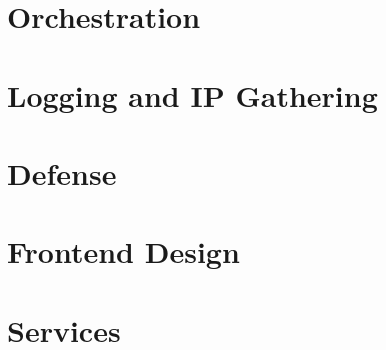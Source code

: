 \documentclass[letterpaper,twocolumn,10pt]{article}
\begin{document}
\section{Orchestration}


\section{Logging and IP Gathering}


\section{Defense}


\section{Frontend Design}



\section{Services}





\end{document}

